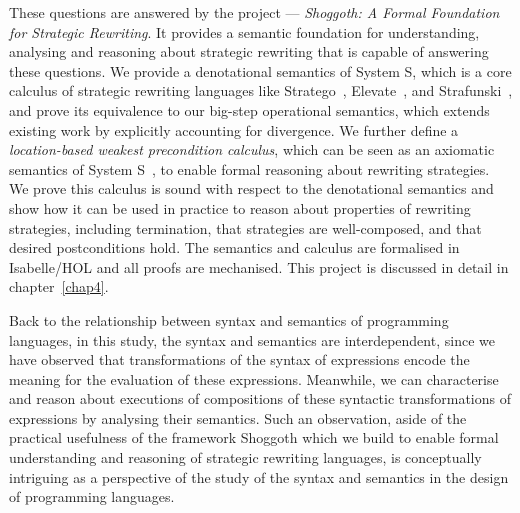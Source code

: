These questions are answered by the project --- \emph{Shoggoth: A Formal Foundation for Strategic Rewriting}. It provides a semantic foundation for understanding, analysing and reasoning about strategic rewriting that is capable of answering these questions.
We provide a denotational semantics of System S, which is a core calculus of strategic rewriting languages like Stratego~\citep{DBLP:conf/icfp/VisserBT98,10.1007/3-540-45127-7_27}, Elevate~\citep{DBLP:journals/cacm/HagedornLKQGS23,DBLP:journals/pacmpl/HagedornLKQGS20}, and Strafunski~\citep{DBLP:conf/rule/LammelV02}, and prove its equivalence to our big-step operational semantics, which extends existing work by explicitly accounting for divergence.
We further define a \emph{location-based weakest precondition calculus}, which can be seen as an axiomatic semantics of System S~\citep{VISSER1998422}, to enable formal reasoning about rewriting strategies. We prove this calculus is sound with respect to the denotational semantics and show how it can be used in practice to reason about properties of rewriting strategies, including termination, that strategies are well-composed, and that desired postconditions hold.
The semantics and calculus are formalised in Isabelle/HOL and all proofs are mechanised. This project is discussed in detail in chapter~\ref{chap4}.

Back to the relationship between syntax and semantics of programming languages, in this study, the syntax and semantics are interdependent, since we have observed that transformations of the syntax of expressions encode the meaning for the evaluation of these expressions. Meanwhile, we can characterise and reason about executions of compositions of these syntactic transformations of expressions by analysing their semantics. Such an observation, aside of the practical usefulness of the framework Shoggoth which we build to enable formal understanding and reasoning of strategic rewriting languages, is conceptually intriguing as a perspective of the study of the syntax and semantics in the design of programming languages.

\begin{center}
\vspace{-0.7em}
\vspace{-0.3em}
\end{center}

